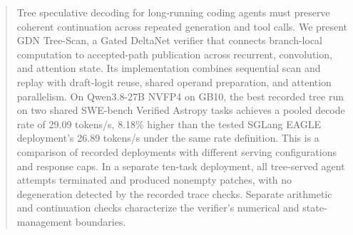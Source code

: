 \begin{abstract}
Tree speculative decoding for long-running coding agents must preserve coherent continuation across repeated generation and tool calls. We present GDN Tree-Scan, a Gated DeltaNet verifier that connects branch-local computation to accepted-path publication across recurrent, convolution, and attention state. Its implementation combines sequential scan and replay with draft-logit reuse, shared operand preparation, and attention parallelism. On Qwen3.8-27B NVFP4 on GB10, the best recorded tree run on two shared SWE-bench Verified Astropy tasks achieves a pooled decode rate of 29.09 tokens/s, 8.18\% higher than the tested SGLang EAGLE deployment's 26.89 tokens/s under the same rate definition. This is a comparison of recorded deployments with different serving configurations and response caps. In a separate ten-task deployment, all tree-served agent attempts terminated and produced nonempty patches, with no degeneration detected by the recorded trace checks. Separate arithmetic and continuation checks characterize the verifier's numerical and state-management boundaries.
\end{abstract}
